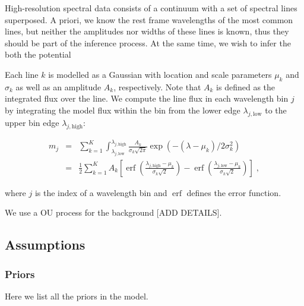 \documentclass[12pt]{emulateapj}
\newcommand{\mean}{m}
\DeclareMathOperator\erf{erf}
\begin{document}
High-resolution spectral data consists of a continuum with a set of spectral lines superposed. A priori, we know the rest frame wavelengths of the most common lines, but neither the amplitudes nor widths of these lines is known, thus they should be part of the inference process. At the same time, we wish to infer the both the potential 

Each line $k$ is modelled as a Gaussian with location and scale parameters $\mu_k$ and $\sigma_k$ as well as an amplitude $A_k$, respectively. Note that $A_k$ is defined as the integrated flux over the line. We compute the line flux in each wavelength bin $j$ by integrating the model flux within the bin from the lower edge $\lambda_{j, \mathrm{low}}$ to the upper bin edge $\lambda_{j, \mathrm{high}}$:

\begin{eqnarray}
\mean_j & = &  \sum_{k=1}^{K}{\int^{\lambda_{j,\mathrm{high}}}_{\lambda_{j, \mathrm{low}}}{\frac{A_k}{\sigma_k\sqrt{2\pi}} \exp{(-(\lambda-\mu_k)/{2\sigma_k^2})}}} \\ \nonumber
& = & \frac{1}{2}\sum_{k=1}^{K} A_k\left[ \erf{\left( \frac{\lambda_{j,\mathrm{high}} - \mu_k}{\sigma_k\sqrt{2}}\right)} - \erf{\left( \frac{\lambda_{j, \mathrm{low}} - \mu_k}{\sigma_k\sqrt{2}}\right)} \right] \; ,
\end{eqnarray}

\noindent where $j$ is the index of a wavelength bin and $\erf$ defines the error function. 

We use a OU process for the background [ADD DETAILS].

 


\subsection{Assumptions}

\subsubsection{Priors}

Here we list all the priors in the model.
\end{document}
